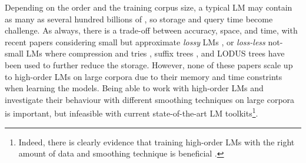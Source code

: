 Depending on the order and the training corpus size, a typical \ngram LM may contain as many as several hundred billions of \ngrams \cite{brants2007large},
so storage and query time become challenge.
%
As always, there is a trade-off between accuracy, space, and time, with recent papers considering small but approximate  \emph{lossy} LMs 
\cite{Chazelle:2004:BFE:982792.982797,guthrie2010storing},
or \emph{loss-less}  not-small LMs \cite{stolcke2011srilm} where compression and tries 
\cite{Germann:2009:TPT:1621947.1621952,heafield2011kenlm,pauls2011faster}, 
suffix trees \cite{kennington2012suffix}, and LODUS trees 
\cite{sall11,DBLP:conf/acl/WatanabeTI09}  
have been used to further reduce the storage.
However, none of these papers scale up to high-order  
\ngram LMs on large corpora due to their  memory and time constrints when learning the models.
%
% 
Being able to work with high-order  LMs and investigate their behaviour 
with different smoothing techniques on large corpora is important, but 
infeasible with current state-of-the-art LM toolkits\footnote{ 
Indeed, there is clearly evidence that training high-order \ngram
LMs with the right amount of data and smoothing technique is beneficial \cite{wood2011sequence}.
}. 

%
%
%
%
 
